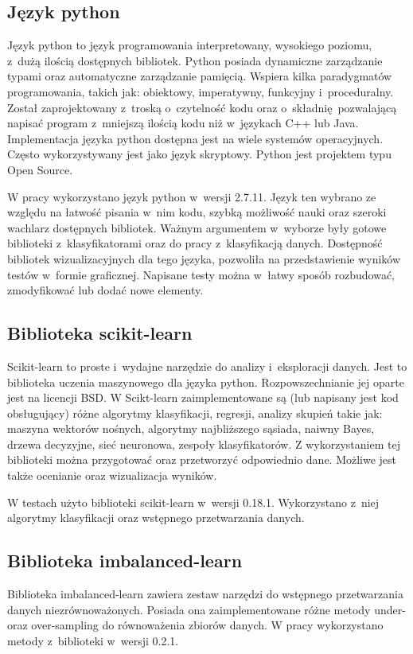 \subsection{Język python}
Język python to język programowania interpretowany, wysokiego poziomu, z~dużą ilością dostępnych bibliotek. Python\cite{python} posiada dynamiczne zarządzanie typami oraz automatyczne zarządzanie pamięcią. Wspiera kilka paradygmatów programowania, takich jak: obiektowy, imperatywny, funkcyjny i~proceduralny. Został zaprojektowany z~troską o~czytelność kodu oraz o~składnię pozwalającą napisać program z~mniejszą ilością kodu niż w~językach C++ lub Java. Implementacja języka python dostępna jest na wiele systemów operacyjnych. Często wykorzystywany jest jako język skryptowy. Python jest projektem typu Open Source. \par
W pracy wykorzystano język python w~wersji 2.7.11. Język ten wybrano ze względu na łatwość pisania w~nim kodu, szybką możliwość nauki oraz szeroki wachlarz dostępnych bibliotek. Ważnym argumentem w~wyborze były gotowe biblioteki z~klasyfikatorami oraz do pracy z~klasyfikacją danych. Dostępność bibliotek wizualizacyjnych dla tego języka, pozwoliła na przedstawienie wyników testów w~formie graficznej. Napisane testy można w~łatwy sposób rozbudować, zmodyfikować lub dodać nowe elementy.    

\subsection{Biblioteka scikit-learn}
Scikit-learn\cite{scikit} to proste i~wydajne narzędzie do analizy i~eksploracji danych. Jest to biblioteka uczenia maszynowego dla języka python. Rozpowszechnianie jej oparte jest na licencji BSD. W Scikt-learn zaimplementowane są (lub napisany jest kod obsługujący) różne algorytmy klasyfikacji, regresji, analizy skupień takie jak: maszyna wektorów nośnych, algorytmy najbliższego sąsiada, naiwny Bayes, drzewa decyzyjne, sieć neuronowa, zespoły klasyfikatorów. Z wykorzystaniem tej biblioteki można przygotować oraz przetworzyć odpowiednio dane. Możliwe jest także ocenianie oraz wizualizacja wyników. \par
W testach użyto biblioteki scikit-learn w~wersji 0.18.1. Wykorzystano z~niej algorytmy klasyfikacji oraz wstępnego przetwarzania danych.
\subsection{Biblioteka imbalanced-learn}
Biblioteka imbalanced-learn\cite{imlearn} zawiera zestaw narzędzi do wstępnego przetwarzania danych niezrównoważonych. Posiada ona zaimplementowane różne metody under- oraz over-sampling do równoważenia zbiorów danych. W pracy wykorzystano metody z~biblioteki w~wersji 0.2.1. 
